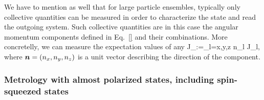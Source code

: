We have to mention as well that for large particle ensembles, typically only collective quantities can be measured in order to characterize the state and read the outgoing system.
Such collective quantities are in this case the angular momentum components defined in Eq.~\eqref{} and their combinations.
More concretelly, we can measure the expectation values of any
\be
  J_{}:=\sum_{l=x,y,z} n_l J_l,
\ee
where $\boldsymbol{n}=(n_x,n_y,n_z)$ is a unit vector describing the direction of the component.

\subsubsection[Metrology with almost polarized states]{Metrology with almost polarized states, including spin-squeezed states}

